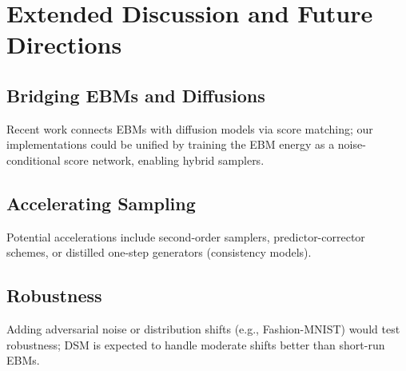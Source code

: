 \documentclass[a4paper,12pt]{article}
\begin{document}
\section{Extended Discussion and Future Directions}
\subsection{Bridging EBMs and Diffusions}
Recent work connects EBMs with diffusion models via score matching; our implementations could be unified by training the EBM energy as a noise-conditional score network, enabling hybrid samplers.
\subsection{Accelerating Sampling}
Potential accelerations include second-order samplers, predictor-corrector schemes, or distilled one-step generators (consistency models).
\subsection{Robustness}
Adding adversarial noise or distribution shifts (e.g., Fashion-MNIST) would test robustness; DSM is expected to handle moderate shifts better than short-run EBMs.
\end{document}
